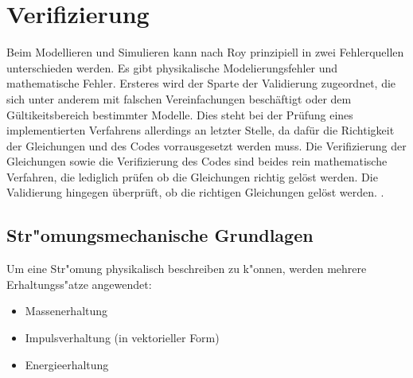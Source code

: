 \newpage
\chapter{Verifizierung}
Beim Modellieren und Simulieren kann nach Roy \cite{roy} prinzipiell in zwei Fehlerquellen unterschieden werden. Es gibt physikalische Modelierungsfehler und mathematische Fehler. Ersteres wird der Sparte der Validierung zugeordnet, die sich unter anderem mit falschen Vereinfachungen beschäftigt oder dem Gültikeitsbereich bestimmter Modelle. Dies steht bei der Prüfung eines implementierten Verfahrens allerdings an letzter Stelle, da dafür die Richtigkeit der Gleichungen und des Codes vorrausgesetzt werden muss.
Die Verifizierung der Gleichungen sowie die Verifizierung des Codes sind beides rein mathematische Verfahren, die lediglich prüfen ob die Gleichungen richtig gelöst werden. Die Validierung hingegen überprüft, ob die richtigen Gleichungen gelöst werden.  \cite{tremblay}.

\section{Str"omungsmechanische Grundlagen}
Um eine Str"omung physikalisch beschreiben zu k"onnen, werden mehrere Erhaltungss"atze angewendet:
\begin{itemize}
	\item Massenerhaltung
	\item Impulsverhaltung (in vektorieller Form)
	\item Energieerhaltung
\end{itemize}